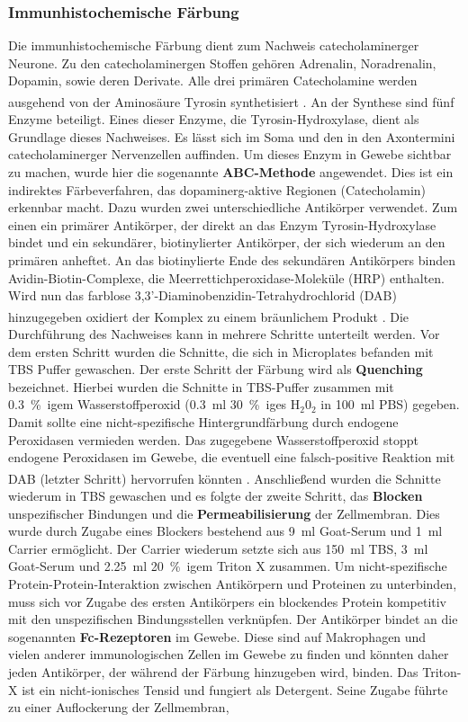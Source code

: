 \documentclass[12pt,a4paper,pdftex]{article}
\begin{document}
\subsubsection{Immunhistochemische Färbung}

Die immunhistochemische Färbung dient zum Nachweis catecholaminerger Neurone. Zu den catecholaminergen Stoffen gehören Adrenalin, Noradrenalin, Dopamin, sowie deren Derivate. Alle drei primären Catecholamine werden ausgehend von der Aminosäure Tyrosin synthetisiert \textsuperscript{\cite[13]{kandel2013principles}}. An der Synthese sind fünf Enzyme beteiligt. Eines dieser Enzyme, die Tyrosin-Hydroxylase, dient als Grundlage dieses Nachweises. Es lässt sich im Soma und den in den Axontermini catecholaminerger Nervenzellen auffinden. Um dieses Enzym in Gewebe sichtbar zu machen, wurde hier die sogenannte \textbf{ABC-Methode} angewendet. Dies ist ein indirektes Färbeverfahren, das dopaminerg-aktive Regionen (Catecholamin) erkennbar macht. Dazu wurden zwei unterschiedliche Antikörper verwendet. Zum einen ein primärer Antikörper, der direkt an das Enzym Tyrosin-Hydroxylase bindet und ein sekundärer, biotinylierter Antikörper, der sich wiederum an den primären anheftet. An das biotinylierte Ende des sekundären Antikörpers binden Avidin-Biotin-Complexe, die Meerrettichperoxidase-Moleküle (HRP) enthalten. Wird nun das farblose 3,3'-Diaminobenzidin-Tetrahydrochlorid (DAB) hinzugegeben oxidiert der Komplex zu einem bräunlichem Produkt \textsuperscript{\cite{burry2009immunocytochemistry}}. Die Durchführung des Nachweises kann in mehrere Schritte unterteilt werden. Vor dem ersten Schritt wurden die Schnitte, die sich in Microplates befanden mit TBS Puffer gewaschen. Der erste Schritt der Färbung wird als \textbf{Quenching} bezeichnet. Hierbei wurden die Schnitte in TBS-Puffer zusammen mit 0.3~\%~igem Wasserstoffperoxid (0.3~ml 30~\%~iges H$_{2}$0$_{2}$ in 100~ml PBS) gegeben. Damit sollte eine nicht-spezifische Hintergrundfärbung durch endogene Peroxidasen vermieden werden. Das zugegebene Wasserstoffperoxid stoppt endogene Peroxidasen im Gewebe, die eventuell eine falsch-positive Reaktion mit DAB (letzter Schritt) hervorrufen könnten \textsuperscript{\cite{burry2009immunocytochemistry}}. Anschließend wurden die Schnitte wiederum in TBS gewaschen und es folgte der zweite Schritt, das \textbf{Blocken} unspezifischer Bindungen und die \textbf{Permeabilisierung} der Zellmembran. Dies wurde durch Zugabe eines Blockers bestehend aus 9~ml Goat-Serum und 1~ml Carrier ermöglicht. Der Carrier wiederum setzte sich aus 150~ml TBS, 3~ml Goat-Serum und 2.25~ml 20~\%~igem Triton X zusammen. Um nicht-spezifische Protein-Protein-Interaktion zwischen Antikörpern und Proteinen zu unterbinden, muss sich vor Zugabe des ersten Antikörpers ein blockendes Protein kompetitiv mit den unspezifischen Bindungsstellen verknüpfen. Der Antikörper bindet an die sogenannten \textbf{Fc-Rezeptoren} im Gewebe. Diese sind auf Makrophagen und vielen anderer immunologischen Zellen im Gewebe zu finden und könnten daher jeden Antikörper, der während der Färbung hinzugeben wird, binden. Das Triton-X ist ein nicht-ionisches Tensid und fungiert als Detergent. Seine Zugabe führte zu einer Auflockerung der Zellmembran, 
\end{document}
